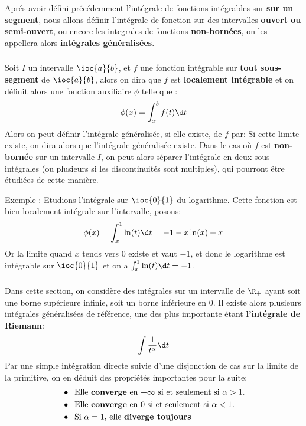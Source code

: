 \chapter*{}
Aprés avoir défini précédemment l'intégrale de fonctions intégrables sur \textbf{sur un segment}, nous allons définir l'intégrale de fonction sur des intervalles \textbf{ouvert ou semi-ouvert}, ou encore les integrales de fonctions \textbf{non-bornées}, on les appellera alors \textbf{intégrales généralisées}.
\subsection*{}
Soit \(I\) un intervalle \(\ioc{a}{b}\), et \(f\) une fonction intégrable sur \textbf{tout sous-segment} de \(\ioc{a}{b}\), alors on dira que \(f\) est \textbf{localement intégrable} et on définit alors une fonction auxiliaire \(\phi\) telle que :
\[
   \phi(x) = \int_{x}^{b} f(t) \d t
\]
Alors on peut définir l'intégrale généralisée, si elle existe, de \(f\) par:
Si cette limite existe, on dira alors que l'intégrale généralisée existe.\+ 
Dans le cas où \(f\) est \textbf{non-bornée} sur un intervalle \(I\), on peut alors séparer l'intégrale en deux sous-intégrales (ou plusieurs si les discontinuités sont multiples), qui pourront être étudiées de cette manière.\<

\underline{Exemple :} Etudions l'intégrale sur \(\ioc{0}{1}\) du logarithme. Cette fonction est bien localement intégrale sur l'intervalle, posons:
\[
   \phi(x) = \int_{x}^{1} \ln(t) \d t = - 1 - x\ln(x) + x 
\]
Or la limite quand \(x\) tends vers \(0\) existe et vaut \(-1\), et donc le logarithme est intégrable sur \(\ioc{0}{1}\) et on a \(\int_{x}^{1} \ln(t) \d t = -1\).
\subsection*{}
Dans cette section, on considère des intégrales sur un intervalle de \(\R_+\) ayant soit une borne supérieure infinie, soit un borne inférieure en 0.\+
Il existe alors plusieurs intégrales généralisées de référence, une des plus importante étant \textbf{l'intégrale de Riemann}:
\[
   \int \frac{1}{t^\alpha} \d t   
\]
Par une simple intégration directe suivie d'une disjonction de cas sur la limite de la primitive, on en déduit des propriétés importantes pour la suite:
\begin{align*}
   &\bullet \;\; \text{Elle \textbf{converge} en \(+\infty\) si et seulement si \(\alpha > 1\).} \\
   &\bullet \;\; \text{Elle \textbf{converge} en \(0\) si et seulement si \(\alpha < 1\).} \\
   &\bullet \;\; \text{Si \(\alpha = 1\), elle \textbf{diverge toujours}}
\end{align*}

